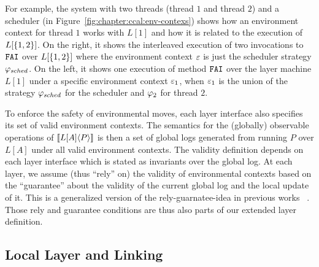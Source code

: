 For example, 
the system with two threads
(thread $1$ and thread $2$) and a scheduler (in Figure~\ref{fig:chapter:ccal:env-contexs})
shows how
an environment context for thread $1$ works with $L[1]$
and how it is related to the execution of  $L[\{1,2\}]$.
On the right, it shows the interleaved execution of
two invocations to ${\mathrm{\texttt{FAI}}}$ over $L[\{1, 2\}]$
where the environment context $\oracle$ is just the scheduler
strategy $\varphi_{sched}$.
On the left, it shows one execution
of method ${\mathrm{\texttt{FAI}}}$ over the layer machine $L[1]$ under a specific
environment context $\oracle_1$, when $\oracle_1$ is the union of
the strategy $\varphi_{sched}$ for the scheduler and $\varphi_{2}$ for
thread $2$. 

To enforce the safety of environmental moves,
each layer interface also specifies its set of valid environment contexts.
The semantics for the (globally) observable operations of $[\![{L[A]} \langle {P} \rangle]\!]$ is then a set of global logs
generated from running $P$ over $L[A]$ under all valid
environment contexts. 
The validity definition depends on each layer interface which is stated as invariants over the global log. 
At each layer, we assume (thus ``rely'' on) the validity of environmental contexts based on the ``guarantee'' about the validity of the current global log and the local update of it. 
This is a generalized version of the rely-guarnatee-idea in previous works ~\cite{feng07:sagl,vafeiadis:marriage,LRG,fu10:roch,sergey15}. 
Those rely and guarantee conditions
are thus also parts of our extended layer definition. 


\subsection{Local Layer and Linking}
\label{chapter:ccal:subsec:local-layer-with-environmental-context-and-local-layer-linking}
 
